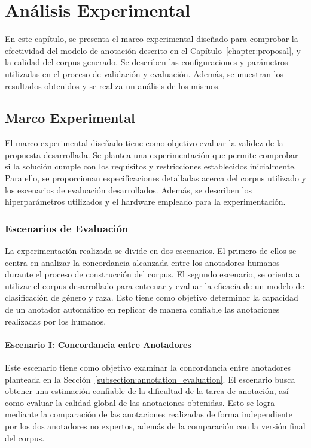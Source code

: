 \chapter{An\'alisis Experimental}\label{chapter:implementation}
En este cap\'itulo, se presenta el marco experimental dise\~nado para comprobar la efectividad del modelo de anotaci\'on 
descrito en el Cap\'itulo~\ref{chapter:proposal}, y la calidad del corpus generado. Se describen las configuraciones y 
par\'ametros utilizadas en el proceso de validaci\'on y evaluaci\'on. Adem\'as, se muestran los resultados obtenidos y 
se realiza un an\'alisis de los mismos.

\section{Marco Experimental}\label{section:experimental_framework}
El marco experimental dise\~nado tiene como objetivo evaluar la validez de la propuesta desarrollada. Se plantea 
una experimentaci\'on que permite comprobar si la soluci\'on cumple con los requisitos y restricciones establecidos inicialmente.
Para ello, se proporcionan especificaciones detalladas acerca del corpus utilizado y los escenarios de evaluaci\'on desarrollados.
Adem\'as, se describen los hiperpar\'ametros utilizados y el hardware empleado para la experimentaci\'on.

\subsection{Escenarios de Evaluaci\'on}
La experimentaci\'on realizada se divide en dos escenarios. El primero de ellos se centra en analizar la concordancia alcanzada entre 
los anotadores humanos durante el proceso de construcci\'on del corpus. El segundo escenario, se orienta a utilizar el corpus 
desarrollado para entrenar y evaluar la eficacia de un modelo de clasificaci\'on de g\'enero y raza. Esto tiene como objetivo determinar
la capacidad de un anotador autom\'atico en replicar de manera confiable las anotaciones realizadas por los humanos. 

\subsubsection{Escenario I: Concordancia entre Anotadores}
Este escenario tiene como objetivo examinar la concordancia entre anotadores planteada en la 
Secci\'on~\ref{subsection:annotation_evaluation}. El escenario busca obtener una estimaci\'on confiable de la dificultad de la 
tarea de anotaci\'on, as\'i como evaluar la calidad global de las anotaciones obtenidas. Esto se logra mediante la comparaci\'on
de las anotaciones realizadas de forma independiente por los dos anotadores no expertos, adem\'as de la comparaci\'on con la 
versi\'on final del corpus.

